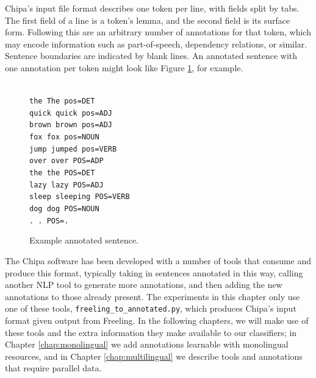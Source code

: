 Chipa's input file format describes one token per line, with fields split by
tabs.  The first field of a line is a token's lemma, and the second field is
its surface form. Following this are an arbitrary number of annotations for
that token, which may encode information such as part-of-speech, dependency
relations, or similar.  Sentence boundaries are indicated by blank lines. An
annotated sentence with one annotation per token might look like Figure
\ref{fig:quickbrownfox}, for example.

\begin{figure}
\raggedright \texttt{\\
the	The	pos=DET \\
quick	quick	pos=ADJ \\
brown	brown	pos=ADJ \\
fox	fox	pos=NOUN \\
jump	jumped	pos=VERB \\
over	over	POS=ADP \\
the	the	POS=DET \\
lazy	lazy	POS=ADJ \\
sleep sleeping	POS=VERB \\
dog	dog	POS=NOUN \\
.	.	POS=. \\
  }
  \caption{Example annotated sentence.}
  \label{fig:quickbrownfox}
\end{figure}

The Chipa software has been developed with a number of tools that consume and
produce this format, typically taking in sentences annotated in this way,
calling another NLP tool to generate more annotations, and then adding the new
annotations to those already present. The experiments in this chapter only use
one of these tools, \texttt{freeling\_to\_annotated.py}, which produces Chipa's
input format given output from Freeling.  In the following chapters, we will
make use of these tools and the extra information they make available to our
classifiers; in Chapter \ref{chap:monolingual} we add annotations learnable
with monolingual resources, and in Chapter \ref{chap:multilingual} we describe
tools and annotations that require parallel data.

